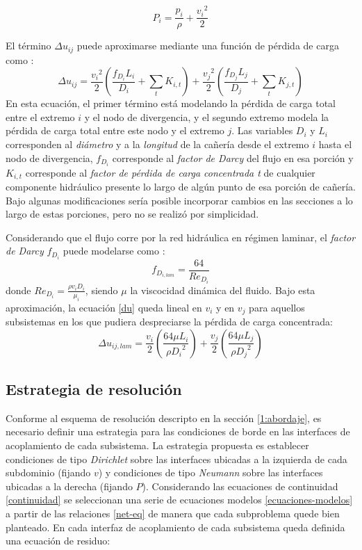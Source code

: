\begin{equation}
P_i = \frac{p_i}{\rho} + \frac{{v_i}^2}{2}
\label{p-eyd}
\end{equation}

El término $\Delta u_{ij}$ puede aproximarse mediante una función de pérdida de carga como \cite{white}:
\begin{equation}
\Delta u_{ij} = \frac{{v_i}^2}{2} \left ( \frac{f_{D_i} L_{i}}{D_i} + \sum_t K_{i,t} \right ) + \frac{{v_j}^2}{2} \left ( \frac{f_{D_j} L_{j}}{D_j} + \sum_t K_{j,t} \right )
\label{du}
\end{equation}
En esta ecuación, el primer término está modelando la pérdida de carga total entre el extremo $i$ y el nodo de divergencia,
y el segundo extremo modela la pérdida de carga total entre este nodo y el extremo $j$.
Las variables $D_i$ y $L_i$ corresponden al \textit{diámetro} y a la \textit{longitud} de la cañería desde el extremo $i$ hasta el nodo de divergencia,
$f_{D_i}$ corresponde al \textit{factor de Darcy} del flujo en esa porción
y $K_{i,t}$ corresponde al \textit{factor de pérdida de carga concentrada t} de cualquier componente hidráulico presente lo largo de algún punto de esa porción de cañería.
Bajo algunas modificaciones sería posible incorporar cambios en las secciones a lo largo de estas porciones, pero no se realizó por simplicidad.

Considerando que el flujo corre por la red hidráulica en régimen laminar, el \textit{factor de Darcy} $f_{D_i}$ puede modelarse como \cite{white}:
\begin{equation}
f_{D_{{i},lam}} = \frac{64}{Re_{D_i}}
\label{f-lam}
\end{equation}
donde $Re_{D_i}=\frac{\rho v_i D_i} {\mu_i}$, siendo $\mu$ la viscocidad dinámica del fluido.
Bajo esta aproximación, la ecuación \ref{du} queda lineal en $v_i$ y en $v_j$ para aquellos subsistemas en los que pudiera despreciarse la pérdida de carga concentrada:
\begin{equation}
\Delta u_{ij,lam} = \frac{{v_i}}{2} \left ( \frac{64 \mu L_{i}}{\rho {D_i}^{2}} \right ) + \frac{{v_j}}{2} \left ( \frac{64 \mu L_{j}}{\rho {D_j}^{2}} \right )
\label{du}
\end{equation}


\subsection*{Estrategia de resolución}
\label{resolucion-net}

Conforme al esquema de resolución descripto en la sección \ref{1:abordaje},
es necesario definir una estrategia para las condiciones de borde en las interfaces de acoplamiento de cada subsistema.
La estrategia propuesta es establecer condiciones de tipo \textit{Dirichlet} sobre las interfaces ubicadas a la izquierda de cada subdominio (fijando $v$)
y condiciones de tipo \textit{Neumann} sobre las interfaces ubicadas a la derecha (fijando $P$).
Considerando las ecuaciones de continuidad \ref{continuidad} se seleccionan una serie de ecuaciones modelos \ref{ecuaciones-modelos}
a partir de las relaciones \ref{net-eq} de manera que cada subproblema quede bien planteado.
En cada interfaz de acoplamiento de cada subsistema queda definida una ecuación de residuo:

